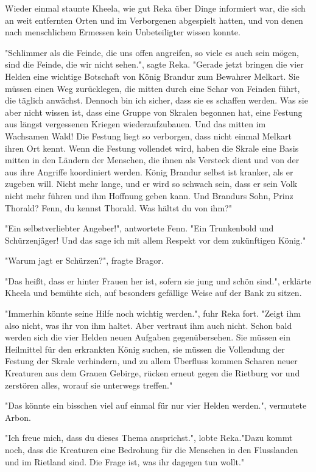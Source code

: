 \documentclass[10pt, a4paper, oneside]{book}
\begin{document}
\begin{multicols}{2}
Wieder einmal staunte Kheela, wie gut Reka über Dinge informiert war, die sich an weit entfernten Orten und im Verborgenen abgespielt hatten, und von denen nach menschlichem Ermessen kein Unbeteiligter wissen konnte. 

"Schlimmer als die Feinde, die uns offen angreifen, so viele es auch sein mögen, sind die Feinde, die wir nicht sehen.", sagte Reka. "Gerade jetzt bringen die vier Helden eine wichtige Botschaft von König Brandur zum Bewahrer Melkart. Sie müssen einen Weg zurücklegen, die mitten durch eine Schar von Feinden führt, die täglich anwächst. Dennoch bin ich sicher, dass sie es schaffen werden. Was sie aber nicht wissen ist, dass eine Gruppe von Skralen begonnen hat, eine Festung aus längst vergessenen Kriegen wiederaufzubauen. Und das mitten im Wachsamen Wald! Die Festung liegt so verborgen, dass nicht einmal Melkart ihren Ort kennt. Wenn die Festung vollendet wird, haben die Skrale eine Basis mitten in den Ländern der Menschen, die ihnen als Versteck dient und von der aus ihre Angriffe koordiniert werden. König Brandur selbst ist kranker, als er zugeben will. Nicht mehr lange, und er wird so schwach sein, dass er sein Volk nicht mehr führen und ihm Hoffnung geben kann. Und Brandurs Sohn, Prinz Thorald? Fenn, du kennst Thorald. Was hältst du von ihm?" 

"Ein selbstverliebter Angeber!", antwortete Fenn. "Ein Trunkenbold und Schürzenjäger! Und das sage ich mit allem Respekt vor dem zukünftigen König." 

"Warum jagt er Schürzen?", fragte Bragor. 

"Das heißt, dass er hinter Frauen her ist, sofern sie jung und schön sind.", erklärte Kheela und bemühte sich, auf besonders gefällige Weise auf der Bank zu sitzen. 

"Immerhin könnte seine Hilfe noch wichtig werden.", fuhr Reka fort. "Zeigt ihm also nicht, was ihr von ihm haltet. Aber vertraut ihm auch nicht. Schon bald werden sich die vier Helden neuen Aufgaben gegenübersehen. Sie müssen ein Heilmittel für den erkrankten König suchen, sie müssen die Vollendung der Festung der Skrale verhindern, und zu allem Überfluss kommen Scharen neuer Kreaturen aus dem Grauen Gebirge, rücken erneut gegen die Rietburg vor und zerstören alles, worauf sie unterwegs treffen." 

"Das könnte ein bisschen viel auf einmal für nur vier Helden werden.", vermutete Arbon. 

"Ich freue mich, dass du dieses Thema ansprichst.", lobte Reka."Dazu kommt noch, dass die Kreaturen eine Bedrohung für die Menschen in den Flusslanden und im Rietland sind. Die Frage ist, was ihr dagegen tun wollt." 


\end{multicols}
\end{document}
